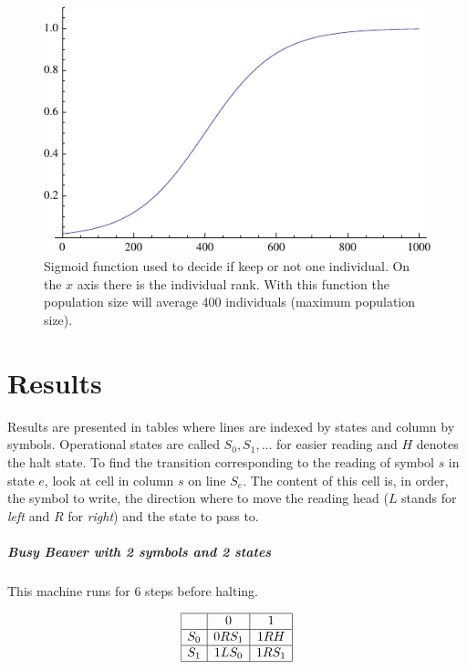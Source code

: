 \documentclass{report}
\begin{document}
\begin{figure}[h]\centering
\includegraphics{figures/decision-function.pdf}
\caption{Sigmoid function used to decide if keep or not one individual. On the $x$ axis there is the individual rank. With this function the population size will average 400 individuals (maximum population size).}
\end{figure}




\chapter{Results}
\label{chap:results}

Results are presented in tables where lines are indexed by states and column by symbols. Operational states are called $S_0, S_1, \dots$ for easier reading and $H$ denotes the halt state. To find the transition corresponding to the reading of symbol $s$ in state $e$, look at cell in column $s$ on line $S_e$. The content of this cell is, in order, the symbol to write, the direction where to move the reading head ($L$ stands for \emph{left} and $R$ for \emph{right}) and the state to pass to.

\paragraph{Busy Beaver with 2 symbols and 2 states}

This machine runs for 6 steps before halting.

\[
\begin{array}[h]{|c|c|c|}
\hline
   &0     &1\\
\hline
S_0& 0RS_1& 1RH\\
\hline
S_1& 1LS_0& 1RS_1\\
\hline
\end{array}
\]
\end{document}
